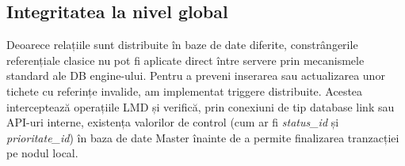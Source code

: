 \subsection{Integritatea la nivel global}
Deoarece relațiile sunt distribuite în baze de date diferite, constrângerile referențiale clasice nu pot fi aplicate direct între servere prin mecanismele standard ale DB engine-ului.
Pentru a preveni inserarea sau actualizarea unor tichete cu referințe invalide, am implementat triggere distribuite. Acestea interceptează operațiile LMD și verifică, prin conexiuni de tip database link sau API-uri interne, existența valorilor de control (cum ar fi \textit{status\_id} și \textit{prioritate\_id}) în baza de date Master înainte de a permite finalizarea tranzacției pe nodul local.